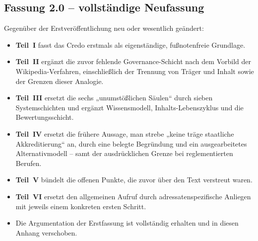 \documentclass[11pt,a4paper]{article}
\begin{document}
\subsection{Fassung 2.0 -- vollständige Neufassung}
Gegenüber der Erstveröffentlichung neu oder wesentlich geändert:
\begin{itemize}[label=--]
    \item \textbf{Teil~I} fasst das Credo erstmals als eigenständige, fußnotenfreie Grundlage.
    \item \textbf{Teil~II} ergänzt die zuvor fehlende Governance-Schicht nach dem Vorbild der Wikipedia-Verfahren, einschließlich der Trennung von Träger und Inhalt sowie der Grenzen dieser Analogie.
    \item \textbf{Teil~III} ersetzt die sechs „unumstößlichen Säulen“ durch sieben Systemschichten und ergänzt Wissensmodell, Inhalts-Lebenszyklus und die Bewertungsschicht.
    \item \textbf{Teil~IV} ersetzt die frühere Aussage, man strebe „keine träge staatliche Akkreditierung“ an, durch eine belegte Begründung und ein ausgearbeitetes Alternativmodell -- samt der ausdrücklichen Grenze bei reglementierten Berufen.
    \item \textbf{Teil~V} bündelt die offenen Punkte, die zuvor über den Text verstreut waren.
    \item \textbf{Teil~VI} ersetzt den allgemeinen Aufruf durch adressatenspezifische Anliegen mit jeweils einem konkreten ersten Schritt.
    \item Die Argumentation der Erstfassung ist vollständig erhalten und in diesen Anhang verschoben.
\end{itemize}
\end{document}

